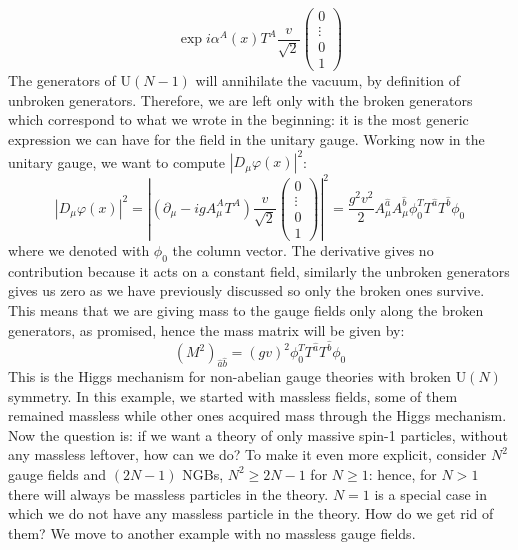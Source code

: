 \documentclass[../main.tex]{subfiles}
\begin{document}
\[
\exp{i\alpha^A(x)T^A}\frac{v}{\sqrt{2}}\begin{pmatrix}
    0\\
    \vdots\\
    0\\
    1
\end{pmatrix}
\]
The generators of U$(N-1)$ will annihilate the vacuum, by definition of unbroken generators. Therefore, we are left only with the broken generators which correspond to what we wrote in the beginning: it is the most generic expression we can have for the field in the unitary gauge. Working now in the unitary gauge, we want to compute $|D_\mu\varphi(x)|^2$:
\[
|D_\mu\varphi(x)|^2=\left|(\partial_\mu-igA_\mu^AT^A)\frac{v}{\sqrt{2}}\begin{pmatrix}
    0\\
    \vdots\\
    0\\1
\end{pmatrix}\right|^2=\frac{g^2v^2}{2}A_\mu^{\hat{a}}A_\mu^{\hat{b}}\phi_0^TT^{\hat{a}}T^{\hat{b}}\phi_0
\]
where we denoted with $\phi_0$ the column vector. The derivative gives no contribution because it acts on a constant field, similarly the unbroken generators gives us zero as we have previously discussed so only the broken ones survive. This means that we are giving mass to the gauge fields only along the broken generators, as promised, hence the mass matrix will be given by:
\[
(M^2)_{\hat{a}\hat{b}}=(gv)^2\phi_0^TT^{\hat{a}}T^{\hat{b}}\phi_0
\]
This is the Higgs mechanism for non-abelian gauge theories with broken U$(N)$ symmetry. In this example, we started with massless fields, some of them remained massless while other ones acquired mass through the Higgs mechanism. Now the question is: if we want a theory of only massive spin-1 particles, without any massless leftover, how can we do? To make it even more explicit, consider $N^2$ gauge fields and $(2N-1)$ NGBs, $N^2\ge2N-1$ for $N\ge1$: hence, for $N>1$ there will always be massless particles in the theory. $N=1$ is a special case in which we do not have any massless particle in the theory. How do we get rid of them? We move to another example with no massless gauge fields.
\end{document}
